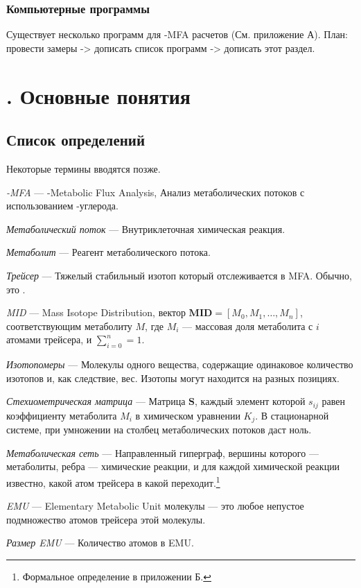 \documentclass[14pt, a4paper]{extreport}
\begin{document}
\clearpage
\subsection{Компьютерные программы}
Существует несколько программ для -MFA расчетов (См. приложение А). 
План: провести замеры -> дописать список программ -> дописать этот раздел.

\chapter[Основные понятия]{\thechapter{}. Основные понятия}
\section{Список определений}
Некоторые термины вводятся позже.

\emph{-MFA} --- -Metabolic Flux Analysis, Анализ метаболических потоков с использованием -углерода.

\emph{Метаболический поток} --- Внутриклеточная химическая реакция.

\emph{Метаболит} --- Реагент метаболического потока.

\emph{Трейсер} --- Тяжелый стабильный изотоп который отслеживается в MFA. Обычно, это .

\emph{MID} --- Mass Isotope Distribution, вектор $\boldsymbol{M\!I\!D} = [M_0, M_1, \ldots, M_n]$, соответствующим метаболиту $M$, где $M_i$ --- массовая доля метаболита с $i$ атомами трейсера, и $\sum_{i = 0}^{n} = 1$.

\emph{Изотопомеры} --- Молекулы одного вещества, содержащие одинаковое количество изотопов и, как следствие, вес. Изотопы могут находится на разных позициях.

\emph{Стехиометрическая матрица} --- Матрица $\boldsymbol{S}$, каждый элемент которой $s_{ij}$ равен коэффициенту метаболита $M_i$ в химическом уравнении $K_j$. В стационарной системе, при умножении на столбец метаболических потоков даст ноль.

\emph{Метаболическая сеть} --- Направленный гиперграф, вершины которого --- метаболиты, ребра --- химические реакции, и для каждой химической реакции известно, какой атом трейсера в какой переходит.\footnote{Формальное определение в приложении Б.}

\emph{EMU} --- Elementary Metabolic Unit молекулы --- это любое непустое подмножество атомов трейсера этой молекулы.

\emph{Размер EMU} --- Количество атомов в EMU.
\end{document}
